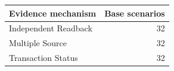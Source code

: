 \begin{tabular}{lr}
\toprule
Evidence mechanism & Base scenarios \\
\midrule
Independent Readback & 32 \\
Multiple Source & 32 \\
Transaction Status & 32 \\
\bottomrule
\end{tabular}
